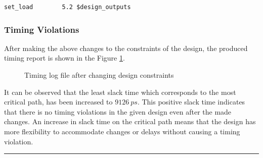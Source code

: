 \documentclass[a4paper,11pt]{article}%
\begin{document}
\begin{Verbatim}[frame=single]
set_load        5.2 $design_outputs
\end{Verbatim}

\subsubsection{Timing Violations}

After making the above changes to the constraints of the design, the produced timing report is shown in the Figure \ref{fig:timing_log3}.

\begin{figure}[H]
	\centering
	\caption{Timing log file after changing design constraints}
	\label{fig:timing_log3}
\end{figure}

It can be observed that the least slack time which corresponds to the most critical path, has been increased to $9126~ps$. This positive slack time indicates that there is no timing violations in the given design even after the made changes. An increase in slack time on the critical path means that the design has more flexibility to accommodate changes or delays without causing a timing violation.

\vfill
\hrule




\end{document}

